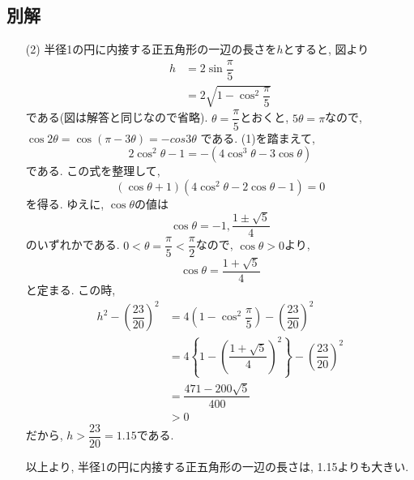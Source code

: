 \documentclass[dvipdfmx,a4paper]{jsarticle}
\newcommand{\2}{I\hspace{-1pt}I}
\newcommand{\3}{I\hspace{-1pt}I\hspace{-1pt}I}
\begin{document}
    \subsection{別解}
    \begin{itemize}
        \item [(2)] 半径1の円に内接する正五角形の一辺の長さを$h$とすると, 
        図より
        \begin{align*}
            h &= 2 \sin \dfrac{\pi}{5} \\
            &= 2 \sqrt{1 - \cos^2 \dfrac{\pi}{5}}
        \end{align*}
        である(図は解答と同じなので省略). 
        $\theta = \dfrac{\pi}{5}$とおくと, $5\theta = \pi$なので, $\cos 2\theta = \cos (\pi - 3\theta) = - cos 3\theta$
        である. (1)を踏まえて, 
        \begin{equation*}
            2\cos^2 \theta -1 = - \left(4\cos^3 \theta -3 \cos \theta \right)
        \end{equation*}
        である. この式を整理して, 
        \begin{equation*}
            (\cos \theta + 1)(4 \cos^2 \theta -2 \cos \theta -1) = 0
        \end{equation*}
        を得る. ゆえに, $\cos \theta$の値は
        \begin{equation*}
            \cos \theta = -1, \dfrac{1 \pm \sqrt{5}}{4}
        \end{equation*}
        のいずれかである. $0 < \theta = \dfrac{\pi}{5} < \dfrac{\pi}{2}$なので, 
        $\cos \theta > 0$より, 
        \begin{equation*}
            \cos \theta = \dfrac{1 + \sqrt{5}}{4}
        \end{equation*}
        と定まる. 
        この時, 
        \begin{align*}
            h^2 - \left(\dfrac{23}{20}\right)^2 
            &= 4\left(1 - \cos^2 \dfrac{\pi}{5}\right) - \left(\dfrac{23}{20}\right)^2\\
            &= 4\left\{1 - \left(\dfrac{1 + \sqrt{5}}{4} \right)^2\right\}- \left(\dfrac{23}{20}\right)^2 \\
            &= \dfrac{471-200\sqrt{5}}{400} \\
            & > 0
        \end{align*}
        だから, $h > \dfrac{23}{20} = 1.15$である. 
    
        以上より, 半径1の円に内接する正五角形の一辺の長さは, 1.15よりも大きい. 
    
    \end{itemize}
\end{document}
